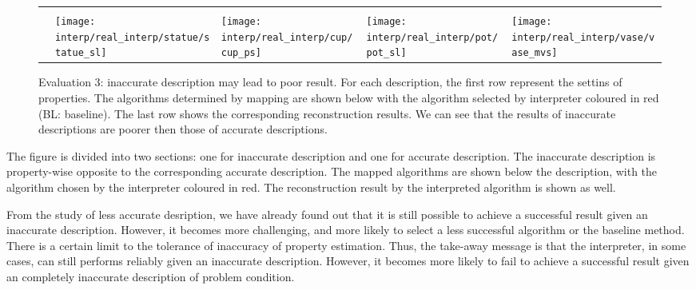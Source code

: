 \begin{figure}[!htbp]
\begin{tabular}{c|*{4}{l}}
& 					& 				   & \tabitem\tc{GSL}	& \\
& \texttt{[image: interp/real\_interp/statue/statue\_sl]}
& \texttt{[image: interp/real\_interp/cup/cup\_ps]}
& \texttt{[image: interp/real\_interp/pot/pot\_sl]}
& \texttt{[image: interp/real\_interp/vase/vase\_mvs]} \\
\bottomrule
\end{tabular}
\caption{Evaluation 3: inaccurate description may lead to poor result. For each description, the first row represent the settins of properties. The algorithms determined by mapping are shown below with the algorithm selected by interpreter coloured in red (BL: baseline). The last row shows the corresponding reconstruction results. We can see that the results of inaccurate descriptions are poorer then those of accurate descriptions.}
\label{fig:eval_3}
\end{figure}

The figure is divided into two sections: one for inaccurate description and one for accurate description. The inaccurate description is property-wise opposite to the corresponding accurate description. The mapped algorithms are shown below the description, with the algorithm chosen by the interpreter coloured in red. The reconstruction result by the interpreted algorithm is shown as well.

From the study of less accurate desription, we have already found out that it is still possible to achieve a successful result given an inaccurate description. However, it becomes more challenging, and more likely to select a less successful algorithm or the baseline method. There is a certain limit to the tolerance of inaccuracy of property estimation. Thus, the take-away message is that the interpreter, in some cases, can still performs reliably given an inaccurate description. However, it becomes more likely to fail to achieve a successful result given an completely inaccurate description of problem condition.



